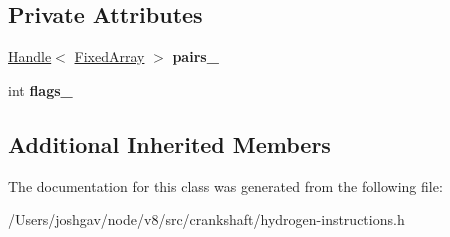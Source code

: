 \subsection*{Private Attributes}
\begin{DoxyCompactItemize}
\item 
\hyperlink{classv8_1_1internal_1_1_handle}{Handle}$<$ \hyperlink{classv8_1_1internal_1_1_fixed_array}{Fixed\+Array} $>$ {\bfseries pairs\+\_\+}\hypertarget{classv8_1_1internal_1_1_h_declare_globals_a86bf85de59e04f3ca0266c8e74c60b55}{}\label{classv8_1_1internal_1_1_h_declare_globals_a86bf85de59e04f3ca0266c8e74c60b55}

\item 
int {\bfseries flags\+\_\+}\hypertarget{classv8_1_1internal_1_1_h_declare_globals_a10acc1cee5206c8be8a76fa935fee8e7}{}\label{classv8_1_1internal_1_1_h_declare_globals_a10acc1cee5206c8be8a76fa935fee8e7}

\end{DoxyCompactItemize}
\subsection*{Additional Inherited Members}


The documentation for this class was generated from the following file\+:\begin{DoxyCompactItemize}
\item 
/\+Users/joshgav/node/v8/src/crankshaft/hydrogen-\/instructions.\+h\end{DoxyCompactItemize}
